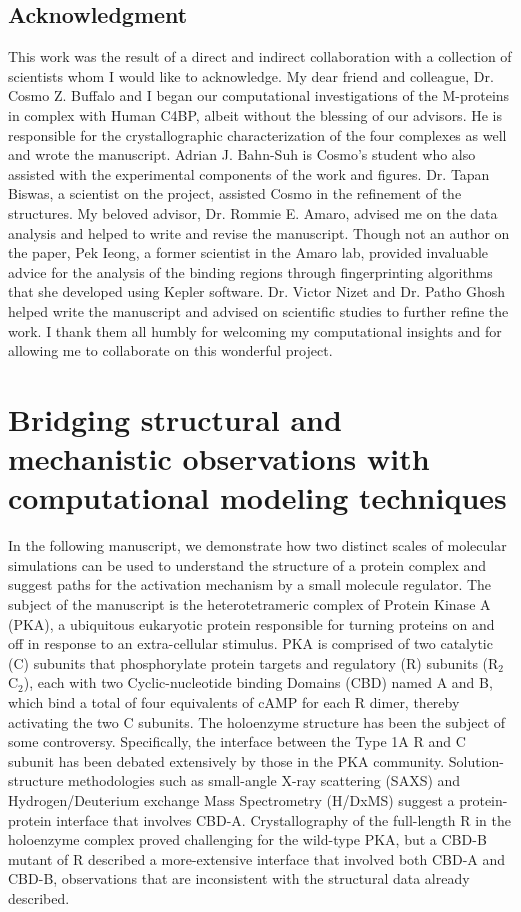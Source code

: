 \documentclass[12pt]{ucsddissertation}
\begin{document}
\section{Acknowledgment}
This work was the result of a direct and indirect collaboration with a collection of scientists whom I would like to acknowledge. My dear friend and colleague, Dr. Cosmo Z. Buffalo and I began our computational investigations of the M-proteins in complex with Human C4BP, albeit without the blessing of our advisors. He is responsible for the crystallographic characterization of the four complexes as well and wrote the manuscript. Adrian J. Bahn-Suh is Cosmo's student who also assisted with the experimental components of the work and figures. Dr. Tapan Biswas, a scientist on the project, assisted Cosmo in the refinement of the structures. My beloved advisor, Dr. Rommie E. Amaro, advised me on the data analysis and helped to write and revise the manuscript. Though not an author on the paper, Pek Ieong, a former scientist in the Amaro lab, provided invaluable advice for the analysis of the binding regions through fingerprinting algorithms that she developed using Kepler software. Dr. Victor Nizet and Dr. Patho Ghosh helped write the manuscript and advised on scientific studies to further refine the work. I thank them all humbly for welcoming my computational insights and for allowing me to collaborate on this wonderful project. 

\chapter{Bridging structural and mechanistic observations with computational modeling techniques}\label{first:paper}
\vspace*{-1.2cm}
In the following manuscript, we demonstrate how two distinct scales of molecular simulations can be used to understand the structure of a protein complex and suggest paths for the activation mechanism by a small molecule regulator. The subject of the manuscript is the heterotetrameric complex of Protein Kinase A (PKA), a ubiquitous eukaryotic protein responsible for turning proteins on and off in response to an extra-cellular stimulus. PKA is comprised of two catalytic (C) subunits that phosphorylate protein targets and regulatory (R) subunits (R$_{2}$C$_{2}$), each with two Cyclic-nucleotide binding Domains (CBD) named A and B, which bind a total of four equivalents of cAMP for each R dimer, thereby activating the two C subunits. The holoenzyme structure has been the subject of some controversy. Specifically, the interface between the Type 1A R and C subunit has been debated extensively by those in the PKA community. Solution-structure methodologies such as small-angle X-ray scattering (SAXS) and Hydrogen/Deuterium exchange Mass Spectrometry (H/DxMS) suggest a protein-protein interface that involves CBD-A. Crystallography of the full-length R in the holoenzyme complex proved challenging for the wild-type PKA, but a CBD-B mutant of R described a more-extensive interface that involved both CBD-A and CBD-B, observations that are inconsistent with the structural data already described.  
\end{document}
